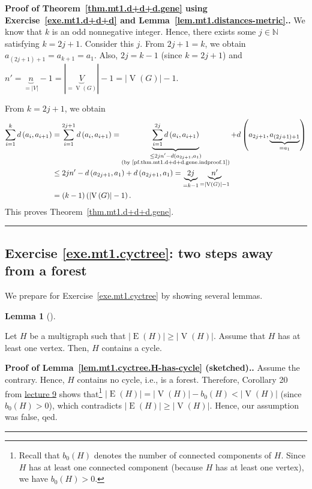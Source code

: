 \documentclass[numbers=enddot,12pt,final,onecolumn,notitlepage]{scrartcl}%
\theoremstyle{definition}
\newtheorem{lem}[theo]{Lemma}
\newenvironment{lemma}[1][]
{\begin{lem}[#1]\begin{leftbar}}
{\end{leftbar}\end{lem}}
\newenvironment{proof}[1][Proof]{\noindent\textbf{#1.} }{\ \rule{0.5em}{0.5em}}
\let\sumnonlimits\sum
\renewcommand{\sum}{\sumnonlimits\limits}
\newcommand{\NN}{\mathbb{N}}
\newcommand{\abs}[1]{\left| #1 \right|}
\newcommand{\tup}[1]{\left( #1 \right)}
\newcommand{\verts}[1]{\operatorname{V}\left( #1 \right)}
\newcommand{\edges}[1]{\operatorname{E}\left( #1 \right)}
\newcommand{\underbrack}[2]{\underbrace{#1}_{\substack{#2}}}
\begin{document}
\begin{proof}[Proof of Theorem~\ref{thm.mt1.d+d+d.gene} using
Exercise~\ref{exe.mt1.d+d+d} and
Lemma~\ref{lem.mt1.distances-metric}.]
We know that $k$ is an odd nonnegative integer.
Hence, there exists some $j \in \NN$ satisfying $k = 2j+1$.
Consider this $j$.
From $2j+1 = k$, we obtain $a_{\tup{2j+1}+1} = a_{k+1} = a_1$.
Also, $2j = k-1$ (since $k = 2j+1$) and
$n' = \underbrace{n}_{= \abs{V}} - 1
= \abs{\underbrace{V}_{= \verts{G}}} - 1
= \abs{\verts{G}} - 1$.

From $k = 2j+1$, we obtain
\begin{align*}
\sum_{i=1}^k d \tup{a_i, a_{i+1}}
&= \sum_{i=1}^{2j+1} d \tup{a_i, a_{i+1}}
 = \underbrack{\sum_{i=1}^{2j} d \tup{a_i, a_{i+1}}}
              {\leq 2j n' - d \tup{a_{2j+1}, a_1} \\
               \text{(by \eqref{pf.thm.mt1.d+d+d.gene.indproof.1})}}
         + d \tup{a_{2j+1}, \underbrace{a_{\tup{2j+1}+1}}_{= a_1}} \\
&\leq 2j n' - d \tup{a_{2j+1}, a_1} + d \tup{a_{2j+1}, a_1}
 = \underbrace{2j}_{= k-1} \underbrace{n'}_{= \abs{\verts{G}} - 1} \\
&= \tup{k-1} \tup{\abs{\verts{G}} - 1} .
\end{align*}
This proves Theorem~\ref{thm.mt1.d+d+d.gene}.
\end{proof}

\subsection{Exercise \ref{exe.mt1.cyctree}: two steps away from a
forest}

We prepare for Exercise~\ref{exe.mt1.cyctree} by showing several
lemmas.

\begin{lemma} \label{lem.mt1.cyctree.H-has-cycle}
Let $H$ be a multigraph such that
$\abs{\edges{H}} \geq \abs{\verts{H}}$.
Assume that $H$ has at least one vertex.
Then, $H$ contains a cycle.
\end{lemma}

\begin{proof}[Proof of Lemma~\ref{lem.mt1.cyctree.H-has-cycle}
(sketched).]
Assume the contrary. Hence, $H$
contains no cycle, i.e., is a forest. Therefore, Corollary 20 from
\href{http://www-users.math.umn.edu/~dgrinber/5707s17/5707lec9.pdf}{lecture 9}
shows that\footnote{Recall that $b_0 \tup{H}$ denotes the number of
connected components of $H$. Since $H$ has at least one connected
component (because $H$ has at least one vertex), we have
$b_0 \tup{H} > 0$.}
$\abs{\edges{H}} = \abs{\verts{H}} - b_0 \tup{H} < \abs{\verts{H}}$
(since $b_0 \tup{H} > 0$), which contradicts
$\abs{\edges{H}} \geq \abs{\verts{H}}$.
Hence, our assumption was false, qed.
\end{proof}
\end{document}
